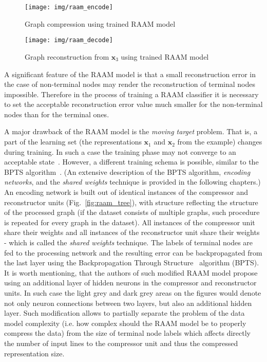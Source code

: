 \begin{figure}
\begin{center}
	\texttt{[image: img/raam\_encode]}
	\caption{Graph compression using trained RAAM model}
	\label{fig:raam_compression}
\end{center}
\end{figure}

\begin{figure}
\begin{center}
	\texttt{[image: img/raam\_decode]}
	\caption{Graph reconstruction from $\bm{x}_3$ using trained RAAM model}
	\label{fig:raam_reconstruction}
\end{center}
\end{figure}

A significant feature of the RAAM model is that a small reconstruction error in the case of non-terminal nodes may render the reconstruction of terminal nodes impossible. Therefore in the process of training a RAAM classifier it is necessary to set the acceptable reconstruction error value much smaller for the non-terminal nodes than for the terminal ones.

A major drawback of the RAAM model is the \emph{moving target} problem. That is, a part of the learning set (the representations $\bm{x}_1$ and $\bm{x}_2$ from the example) changes during training. In such a case the training phase may not converge to an acceptable state~\cite{goulon2005hopfield}. However, a different training schema is possible, similar to the BPTS algorithm~\cite{goulon2005hopfield}. (An extensive description of the BPTS algorithm, \emph{encoding networks}, and the \emph{shared weights} technique is provided in the following chapters.) An encoding network is built out of identical instances of the compressor and reconstructor units (Fig.~\ref{fig:raam_tree}), with structure reflecting the structure of the processed graph (if the dataset consists of multiple graphs, such procedure is repeated for every graph in the dataset). All instances of the compressor unit share their weights and all instances of the reconstructor unit share their weights - which is called the \emph{shared weights} technique. The labels of terminal nodes are fed to the processing network and the resulting error can be backpropagated from the last layer using the Backpropagation Through Structure~\cite{kuchler1996inductive} algorithm (BPTS). It is worth mentioning, that the authors of such modified RAAM model propose using an additional layer of hidden neurons in the compressor and reconstructor units. In such case the light grey and dark grey areas on the figures would denote not only neuron connections between two layers, but also an additional hidden layer. Such modification allows to partially separate the problem of the data model complexity (i.e. how complex should the RAAM model be to properly compress the data) from the size of terminal node labels which affects directly the number of input lines to the compressor unit and thus the compressed representation size.

